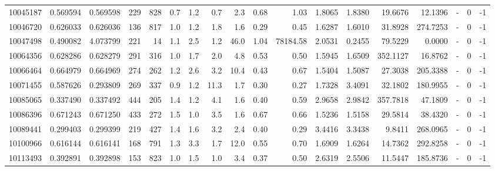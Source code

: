 \begin{tabular}{rrrrrrrrrrrrrrrlrr}
  10045187 & 0.569594 &   0.569598 &  229 &  828 &      0.7 &      1.2 &     0.7 &      2.3 &       0.68 &        1.03 &  1.8065 &  1.8380 &   19.6676 &   12.1396 &             - &        0 &         -1 \\
  10046720 & 0.626033 &   0.626036 &  136 &  817 &      1.0 &      1.2 &     1.8 &      1.6 &       0.29 &        0.45 &  1.6287 &  1.6010 &   31.8928 &  274.7253 &             - &        0 &         -1 \\
  10047498 & 0.490082 &   4.073799 &  221 &   14 &      1.1 &      2.5 &     1.2 &     46.0 &       1.04 &    78184.58 &  2.0531 &  0.2455 &   79.5229 &    0.0000 &             - &        0 &         -1 \\
  10064356 & 0.628286 &   0.628279 &  291 &  316 &      1.0 &      1.7 &     2.0 &      4.8 &       0.53 &        0.50 &  1.5945 &  1.6509 &  352.1127 &   16.8762 &             - &        0 &         -1 \\
  10066464 & 0.664979 &   0.664969 &  274 &  262 &      1.2 &      2.6 &     3.2 &     10.4 &       0.43 &        0.67 &  1.5404 &  1.5087 &   27.3038 &  205.3388 &             - &        0 &         -1 \\
  10071455 & 0.587626 &   0.293809 &  269 &  337 &      0.9 &      1.2 &    11.3 &      1.7 &       0.30 &        0.27 &  1.7328 &  3.4091 &   32.1802 &  180.9955 &             - &        0 &         -1 \\
  10085065 & 0.337490 &   0.337492 &  444 &  205 &      1.4 &      1.2 &     4.1 &      1.6 &       0.40 &        0.59 &  2.9658 &  2.9842 &  357.7818 &   47.1809 &             - &        0 &         -1 \\
  10086396 & 0.671243 &   0.671250 &  433 &  272 &      1.5 &      1.0 &     3.5 &      1.6 &       0.67 &        0.66 &  1.5236 &  1.5158 &   29.5814 &   38.4320 &             - &        0 &         -1 \\
  10089441 & 0.299403 &   0.299399 &  219 &  427 &      1.4 &      1.6 &     3.2 &      2.4 &       0.40 &        0.29 &  3.4416 &  3.3438 &    9.8411 &  268.0965 &             - &        0 &         -1 \\
  10100966 & 0.616144 &   0.616141 &  168 &  791 &      1.3 &      3.3 &     1.7 &     12.0 &       0.55 &        0.70 &  1.6909 &  1.6264 &   14.7362 &  292.8258 &             - &        0 &         -1 \\
  10113493 & 0.392891 &   0.392898 &  153 &  823 &      1.0 &      1.5 &     1.0 &      3.4 &       0.37 &        0.50 &  2.6319 &  2.5506 &   11.5447 &  185.8736 &             - &        0 &         -1 \\

\end{tabular}

